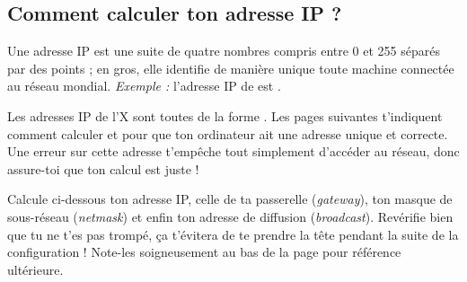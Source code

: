 \subsection{Comment calculer ton adresse IP ?}

\label{calcul_ip}

Une adresse IP est une suite de quatre nombres compris entre 0 et
255 séparés par des points ; en gros, elle identifie de manière
unique toute machine connectée au réseau mondial. \emph{Exemple :}
l'adresse IP de \fkz est .

Les adresses IP de l'X sont toutes de la forme .
Les pages suivantes t'indiquent comment calculer  et  pour que ton
ordinateur ait une adresse unique et correcte. Une erreur sur cette adresse t'empêche tout simplement d'accéder au réseau, donc assure-toi que ton calcul est juste !

Calcule ci-dessous ton adresse IP, celle de ta passerelle (\emph{gateway}), ton masque de sous-réseau
(\emph{netmask}) et enfin ton adresse de diffusion (\emph{broadcast}).
Revérifie bien que tu ne t'es pas trompé,  ça t'évitera de te prendre la tête pendant la suite de la configuration !
Note-les soigneusement au bas de la page \pageref{tableauIp} pour référence ultérieure.

